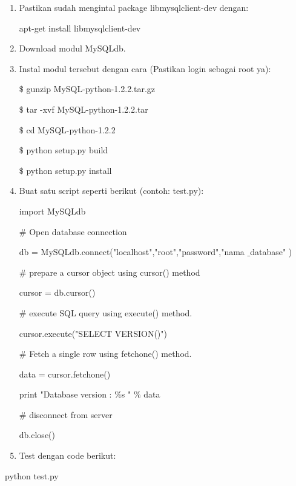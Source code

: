 \begin{enumerate}
\item Pastikan sudah mengintal package libmysqlclient-dev dengan: \par
apt-get install libmysqlclient-dev \par
\noindent 
\item Download modul MySQLdb. \par
\noindent 
\item Instal modul tersebut dengan cara (Pastikan login sebagai root ya): \par
 $  \$  $ gunzip MySQL-python-1.2.2.tar.gz \par
 $  \$  $ tar -xvf MySQL-python-1.2.2.tar \par
 $  \$  $ cd MySQL-python-1.2.2 \par
 $  \$  $ python setup.py build \par
 $  \$  $ python setup.py install \par
\noindent 
\item Buat satu script seperti berikut (contoh: test.py): \par
import MySQLdb \par
 $  \#  $ Open database connection \par
db = MySQLdb.connect("localhost","root","password","nama $  \_  $database" ) \par
 $  \#  $ prepare a cursor object using cursor() method \par
cursor = db.cursor() \par
 $  \#  $ execute SQL query using execute() method. \par
cursor.execute("SELECT VERSION()") \par
 $  \#  $ Fetch a single row using fetchone() method. \par
data = cursor.fetchone() \par
print "Database version :  $  \%  $s "  $  \%  $ data \par
 $  \#  $ disconnect from server \par
db.close() \par
\noindent 
\item Test dengan code berikut:\end{enumerate}
 \par
python test.py \par
\vspace{12pt}
